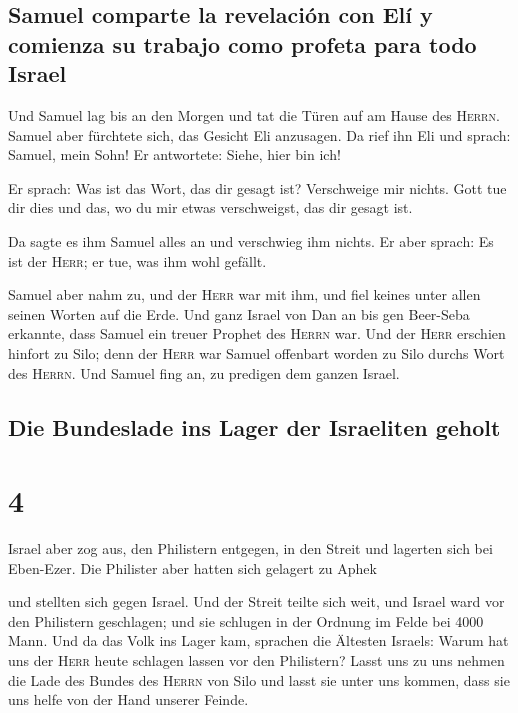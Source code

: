 \hypertarget{samuel-comparte-la-revelaciuxf3n-con-eluxed-y-comienza-su-trabajo-como-profeta-para-todo-israel}{%
\subsection{Samuel comparte la revelación con Elí y comienza su trabajo
como profeta para todo
Israel}\label{samuel-comparte-la-revelaciuxf3n-con-eluxed-y-comienza-su-trabajo-como-profeta-para-todo-israel}}

 Und Samuel lag bis an den Morgen und tat die Türen auf
am Hause des \textsc{Herrn}. Samuel aber fürchtete sich, das Gesicht Eli
anzusagen.  Da rief ihn Eli und sprach: Samuel, mein
Sohn! Er antwortete: Siehe, hier bin ich!

 Er sprach: Was ist das Wort, das dir gesagt ist?
Verschweige mir nichts. Gott tue dir dies und das, wo du mir etwas
verschweigst, das dir gesagt ist.

 Da sagte es ihm Samuel alles an und verschwieg ihm
nichts. Er aber sprach: Es ist der \textsc{Herr}; er tue, was ihm wohl
gefällt.

 Samuel aber nahm zu, und der \textsc{Herr} war mit ihm,
und fiel keines unter allen seinen Worten auf die Erde. 
Und ganz Israel von Dan an bis gen Beer-Seba erkannte, dass Samuel ein
treuer Prophet des \textsc{Herrn} war.  Und der
\textsc{Herr} erschien hinfort zu Silo; denn der \textsc{Herr} war
Samuel offenbart worden zu Silo durchs Wort des \textsc{Herrn}. Und
Samuel fing an, zu predigen dem ganzen Israel.

\hypertarget{die-bundeslade-ins-lager-der-israeliten-geholt}{%
\subsection{Die Bundeslade ins Lager der Israeliten
geholt}\label{die-bundeslade-ins-lager-der-israeliten-geholt}}

\hypertarget{section-3}{%
\section{4}\label{section-3}}

 Israel aber zog aus, den Philistern entgegen, in den
Streit und lagerten sich bei Eben-Ezer. Die Philister aber hatten sich
gelagert zu Aphek

 und stellten sich gegen Israel. Und der Streit teilte
sich weit, und Israel ward vor den Philistern geschlagen; und sie
schlugen in der Ordnung im Felde bei 4000 Mann.  Und da
das Volk ins Lager kam, sprachen die Ältesten Israels: Warum hat uns der
\textsc{Herr} heute schlagen lassen vor den Philistern? Lasst uns zu uns
nehmen die Lade des Bundes des \textsc{Herrn} von Silo und lasst sie
unter uns kommen, dass sie uns helfe von der Hand unserer Feinde.

